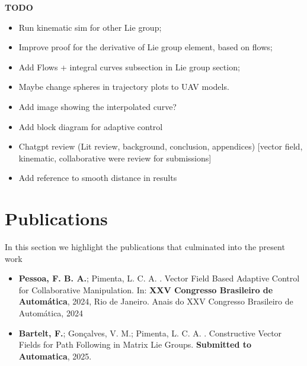\textbf{TODO}
\begin{itemize}
    \item Run kinematic sim for other Lie group;
    \item Improve proof for the derivative of Lie group element, based on flows;
    \item Add Flows + integral curves subsection in Lie group section;
    \item Maybe change spheres in trajectory plots to UAV models.
    \item Add image showing the interpolated curve?
    \item Add block diagram for adaptive control
    \item Chatgpt review (Lit review, background, conclusion, appendices) [vector field, kinematic, collaborative were review for submissions]
    \item Add reference to smooth distance in results
\end{itemize}
\section{Publications}
In this section we highlight the publications that culminated into the present work
\begin{itemize}
    \item \textbf{Pessoa, F. B. A.}; Pimenta, L. C. A. . Vector Field Based Adaptive Control for Collaborative Manipulation. In: \textbf{XXV Congresso Brasileiro de Automática}, 2024, Rio de Janeiro. Anais do XXV Congresso Brasileiro de Automática, 2024
    \item \textbf{Bartelt, F.}; Gonçalves, V. M.; Pimenta, L. C. A. . Constructive Vector Fields for Path Following in Matrix Lie Groups. \textbf{Submitted to Automatica}, 2025.
\end{itemize}
